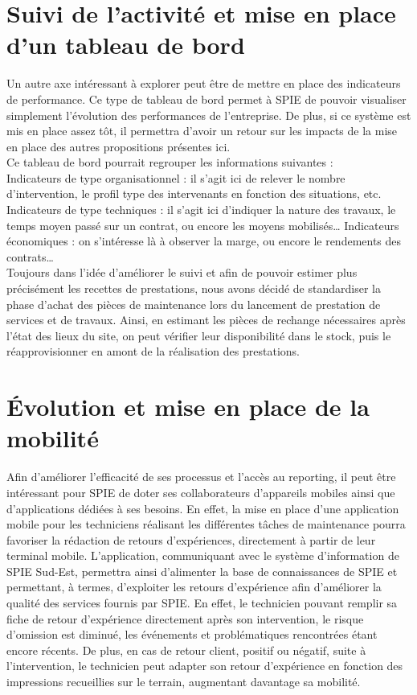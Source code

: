 
\section{Suivi de l’activité et mise en place d’un tableau de bord}

Un autre axe intéressant à explorer peut être de mettre en place des indicateurs de performance. 
Ce type de tableau de bord permet à SPIE de pouvoir visualiser simplement l’évolution des performances de l’entreprise. De plus, si ce système est mis en place assez tôt, il permettra d’avoir un retour sur les impacts de la mise en place des autres propositions présentes ici. \\

Ce tableau de bord pourrait regrouper les informations suivantes : \\
    
Indicateurs de type organisationnel : il s’agit ici de relever le nombre d’intervention, le profil type des intervenants en fonction des situations, etc.
Indicateurs de type techniques : il s’agit ici d’indiquer la nature des travaux, le temps moyen passé sur un contrat, ou encore les moyens mobilisés\dots
Indicateurs économiques : on s’intéresse là à observer la marge, ou encore le rendements des contrats\dots \\

Toujours dans l’idée d’améliorer le suivi et afin de pouvoir estimer plus précisément les recettes de prestations, nous avons décidé de standardiser la phase d’achat des pièces de maintenance lors du lancement de prestation de services et de travaux. Ainsi, en estimant les pièces de rechange nécessaires après l’état des lieux du site, on peut vérifier leur disponibilité dans le stock, puis le réapprovisionner en amont de la réalisation des prestations.

\section{Évolution et mise en place de la mobilité}

Afin d’améliorer l’efficacité de ses processus et l’accès au reporting, il peut être intéressant pour SPIE de doter ses collaborateurs d’appareils mobiles ainsi que d’applications dédiées à ses besoins. En effet, la mise en place d’une application mobile pour les techniciens réalisant les différentes tâches de maintenance pourra favoriser la rédaction de retours d’expériences, directement à partir de leur terminal mobile. L’application, communiquant avec le système d’information de SPIE Sud-Est, permettra ainsi d’alimenter la base de connaissances de SPIE et permettant, à termes, d’exploiter les retours d’expérience afin d’améliorer la qualité des services fournis par SPIE. En effet, le technicien pouvant remplir sa fiche de retour d’expérience directement après son intervention, le risque d’omission est diminué, les événements et problématiques rencontrées étant encore récents. De plus, en cas de retour client, positif ou négatif, suite à l’intervention, le technicien peut adapter son retour d’expérience en fonction des impressions recueillies sur le terrain, augmentant davantage sa mobilité. \\

